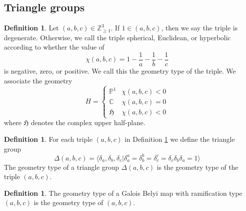\documentclass{dcthesis}
\newcommand{\PP}{\mathbb P}
\newcommand{\CC}{\mathbb C}
\newcommand{\ZZ}{\mathbb Z}
\newcommand{\defi}[1]{\textsf{#1}}
\theoremstyle{definition}
\newtheorem{definition}[prop]{Definition}
\theoremstyle{remark}
\numberwithin{equation}{section}
\numberwithin{figure}{section}
\begin{document}
{{    \subsection{Triangle groups}{\label{subsec:trianglegroups}
      \begin{definition}
        \label{def:geometrytype}
        Let $(a,b,c)\in\ZZ_{\geq 1}^3$.
        If $1\in(a,b,c)$, then we say the triple is \defi{degenerate}.
        Otherwise, we call the triple
        \defi{spherical},
        \defi{Euclidean},
        or \defi{hyperbolic}
        according to whether the value of
        \begin{equation}
          \label{eqn:eulerchar}
          \chi(a,b,c) = 1-\frac{1}{a}-\frac{1}{b}-\frac{1}{c}
        \end{equation}
        is negative, zero, or positive.
        We call this the \defi{geometry type}
        of the triple.
        We associate the \defi{geometry}
        \begin{equation}
          \label{eqn:geometrytype}
          H=
          \begin{cases}
            \PP^1&\chi(a,b,c)<0\\
            \CC&\chi(a,b,c)=0\\
            \mathfrak{H}&\chi(a,b,c)<0
          \end{cases}
        \end{equation}
        where $\mathfrak{H}$ denotes the complex upper half-plane.
      \end{definition}
      \begin{definition}
        \label{def:trianglegroup}
        For each triple $(a,b,c)$ in Definition \ref{def:geometrytype}
        we define the \defi{triangle group}
        \begin{equation}
          \label{eqn:trianglegroup}
          \Delta(a,b,c)
          =
          \langle
          \delta_a, \delta_b, \delta_c |
          \delta_a^a=\delta_b^b=\delta_c^c=\delta_c\delta_b\delta_a=1
          \rangle
        \end{equation}
        The \defi{geometry type}
        of a triangle group $\Delta(a,b,c)$
        is the geometry type of the triple $(a,b,c)$.
      \end{definition}
      \begin{definition}\label{def:geometrytypeofbelyimap}
        The \defi{geometry type} of a Galois Belyi map
        with ramification type $(a,b,c)$
        is the geometry type of $(a,b,c)$.
      \end{definition}
}}}
\end{document}
